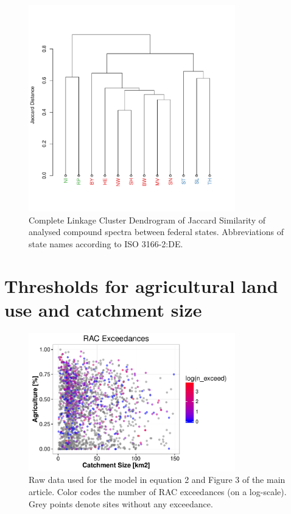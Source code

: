 \documentclass[pdftex,a4paper]{scrreprt}
\begin{document}
\begin{figure}[h]
	\centering
	\includegraphics[width = 0.8\textwidth]{varclus}
	\caption[Complete Linkage Cluster Dendrogram of Jaccard Similarity of analysed compound spectra between federal states.]{Complete Linkage Cluster Dendrogram of Jaccard Similarity of analysed compound spectra between federal states. Abbreviations of state names according to ISO 3166-2:DE.}
	\label{fig:varclus}
\end{figure}






\chapter{Thresholds for agricultural land use and catchment size}
\begin{figure}[h]
	\centering
	\includegraphics[width = 0.8\textwidth]{ezgagrirac}
	\caption{Raw data used for the model in equation 2 and Figure 3 of the main article. Color codes the number of RAC exceedances (on a log-scale). Grey points denote sites without any exceedance.}
	\label{fig:ezgagrirac}
\end{figure}
\end{document}
